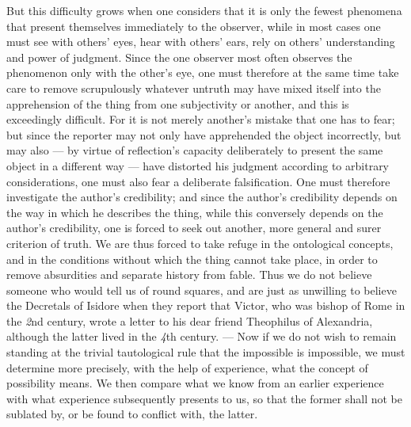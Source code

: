 \documentclass[12pt]{book}
\newcommand{\opage}[1]{\marginnote{\footnotesize\textit{[#1]}}}
\begin{document}
But this difficulty grows when one considers that it is only the fewest
phenomena that present themselves immediately to the observer, while in most
cases one must see with others' eyes, hear with others' ears, rely on others'
understanding and power of judgment. Since the one observer most often observes
the phenomenon only with the other's eye, one must therefore at the same time
take care to remove scrupulously whatever untruth may have mixed itself into
the apprehension of the thing from one subjectivity or another, and this is
exceedingly
\opage{14} difficult. For it is not merely another's mistake that one has to
fear; but since the reporter may not only have apprehended the object
incorrectly, but may also --- by virtue of reflection's capacity deliberately
to present the same object in a different way --- have distorted his judgment
according to arbitrary considerations, one must also fear a deliberate
falsification. One must therefore investigate the author's credibility; and
since the author's credibility depends on the way in which he describes the
thing, while this conversely depends on the author's credibility, one is forced
to seek out another, more general and surer criterion of truth. We are thus
forced to take refuge in the ontological concepts, and in the conditions
without which the thing cannot take place, in order to remove absurdities and
separate history from fable. Thus we do not believe someone who would tell us
of round squares, and are just as unwilling to believe the Decretals of Isidore
when they report that Victor, who was bishop of Rome in the \textit{2}nd
century, wrote a letter to his dear friend Theophilus of Alexandria, although
the latter lived in the \textit{4}th century. --- Now if we do not wish to
remain standing at the trivial tautological rule that the impossible is
impossible, we must determine more precisely, with the help of experience, what
the concept of possibility means. We then compare what we know from an earlier
experience with what experience subsequently presents to us, so that the former
shall not be sublated by, or be found to conflict with, the latter.
\end{document}
